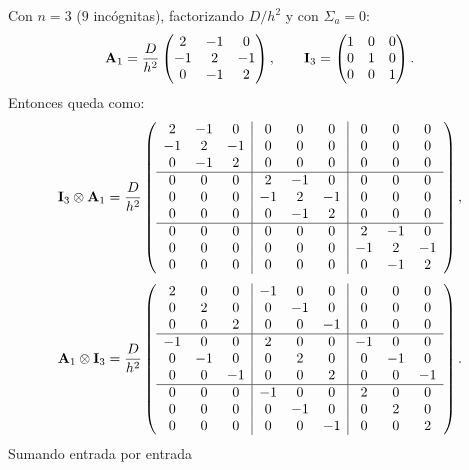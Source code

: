 Con $n = 3$ ($9$ incógnitas), factorizando $D/h^2$ y con $\Sigma_a = 0$:
\[
\mathbf{A}_1 = \frac{D}{h^2}\begin{pmatrix} 2 & -1 & 0\\ -1 & 2 & -1\\ 0 & -1 & 2\end{pmatrix},
\qquad
\mathbf{I}_3 = \begin{pmatrix} 1 & 0 & 0\\ 0 & 1 & 0\\ 0 & 0 & 1\end{pmatrix}.
\]
Entonces queda como:
{\setlength{\arraycolsep}{3.5pt}
	\[
	\mathbf{I}_3\otimes\mathbf{A}_1 = \frac{D}{h^2}\left(
	\begin{array}{ccc|ccc|ccc}
		2 & -1 &  0 &  0 &  0 &  0 &  0 &  0 &  0\\
		-1 &  2 & -1 &  0 &  0 &  0 &  0 &  0 &  0\\
		0 & -1 &  2 &  0 &  0 &  0 &  0 &  0 &  0\\ \hline
		0 &  0 &  0 &  2 & -1 &  0 &  0 &  0 &  0\\
		0 &  0 &  0 & -1 &  2 & -1 &  0 &  0 &  0\\
		0 &  0 &  0 &  0 & -1 &  2 &  0 &  0 &  0\\ \hline
		0 &  0 &  0 &  0 &  0 &  0 &  2 & -1 &  0\\
		0 &  0 &  0 &  0 &  0 &  0 & -1 &  2 & -1\\
		0 &  0 &  0 &  0 &  0 &  0 &  0 & -1 &  2
	\end{array}\right),
	\]
	\[
	\mathbf{A}_1\otimes\mathbf{I}_3 = \frac{D}{h^2}\left(
	\begin{array}{ccc|ccc|ccc}
		2 &  0 &  0 & -1 &  0 &  0 &  0 &  0 &  0\\
		0 &  2 &  0 &  0 & -1 &  0 &  0 &  0 &  0\\
		0 &  0 &  2 &  0 &  0 & -1 &  0 &  0 &  0\\ \hline
		-1 &  0 &  0 &  2 &  0 &  0 & -1 &  0 &  0\\
		0 & -1 &  0 &  0 &  2 &  0 &  0 & -1 &  0\\
		0 &  0 & -1 &  0 &  0 &  2 &  0 &  0 & -1\\ \hline
		0 &  0 &  0 & -1 &  0 &  0 &  2 &  0 &  0\\
		0 &  0 &  0 &  0 & -1 &  0 &  0 &  2 &  0\\
		0 &  0 &  0 &  0 &  0 & -1 &  0 &  0 &  2
	\end{array}\right).
	\]}
Sumando entrada por entrada 
